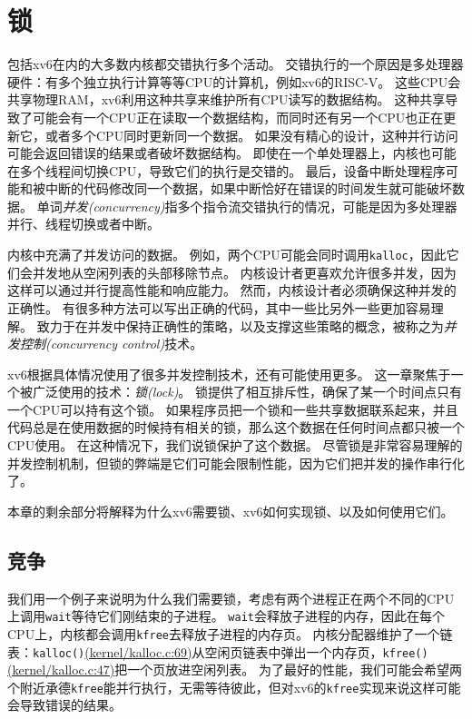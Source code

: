 \chapter{锁}\label{ch06}

包括xv6在内的大多数内核都交错执行多个活动。
交错执行的一个原因是多处理器硬件：有多个独立执行计算等等CPU的计算机，例如xv6的RISC-V。
这些CPU会共享物理RAM，xv6利用这种共享来维护所有CPU读写的数据结构。
这种共享导致了可能会有一个CPU正在读取一个数据结构，而同时还有另一个CPU也正在更新它，或者多个CPU同时更新同一个数据。
如果没有精心的设计，这种并行访问可能会返回错误的结果或者破坏数据结构。
即使在一个单处理器上，内核也可能在多个线程间切换CPU，导致它们的执行是交错的。
最后，设备中断处理程序可能和被中断的代码修改同一个数据，如果中断恰好在错误的时间发生就可能破坏数据。
单词\emph{并发(concurrency)}指多个指令流交错执行的情况，可能是因为多处理器并行、线程切换或者中断。

内核中充满了并发访问的数据。
例如，两个CPU可能会同时调用\texttt{kalloc}，因此它们会并发地从空闲列表的头部移除节点。
内核设计者更喜欢允许很多并发，因为这样可以通过并行提高性能和响应能力。
然而，内核设计者必须确保这种并发的正确性。
有很多种方法可以写出正确的代码，其中一些比另外一些更加容易理解。
致力于在并发中保持正确性的策略，以及支撑这些策略的概念，被称之为\emph{并发控制(concurrency control)}技术。

xv6根据具体情况使用了很多并发控制技术，还有可能使用更多。
这一章聚焦于一个被广泛使用的技术：\emph{锁(lock)}。
锁提供了相互排斥性，确保了某一个时间点只有一个CPU可以持有这个锁。
如果程序员把一个锁和一些共享数据联系起来，并且代码总是在使用数据的时候持有相关的锁，那么这个数据在任何时间点都只被一个CPU使用。
在这种情况下，我们说锁保护了这个数据。
尽管锁是非常容易理解的并发控制机制，但锁的弊端是它们可能会限制性能，因为它们把并发的操作串行化了。

本章的剩余部分将解释为什么xv6需要锁、xv6如何实现锁、以及如何使用它们。

\section{竞争}
我们用一个例子来说明为什么我们需要锁，考虑有两个进程正在两个不同的CPU上调用\texttt{wait}等待它们刚结束的子进程。
\texttt{wait}会释放子进程的内存，因此在每个CPU上，内核都会调用\texttt{kfree}去释放子进程的内存页。
内核分配器维护了一个链表：\texttt{kalloc()}\href{https://github.com/mit-pdos/xv6-riscv/blob/risc/kernel/kalloc.c#L69}{(kernel/kalloc.c:69)}从空闲页链表中弹出一个内存页，\texttt{kfree()}\href{https://github.com/mit-pdos/xv6-riscv/blob/risc/kernel/kalloc.c#L47}{(kernel/kalloc.c:47)}把一个页放进空闲列表。
为了最好的性能，我们可能会希望两个附近承德\texttt{kfree}能并行执行，无需等待彼此，但对xv6的\texttt{kfree}实现来说这样可能会导致错误的结果。

